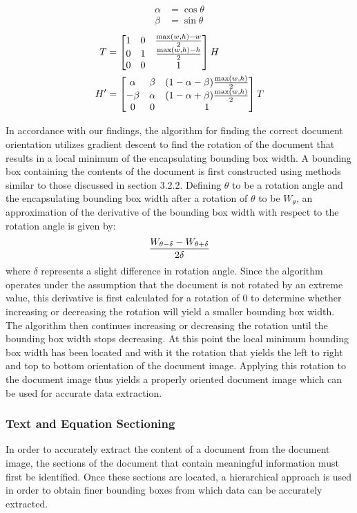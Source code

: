 \documentclass[10pt]{IEEEtran}
\begin{document}
\begin{align*}
\alpha &= \cos \theta \\
\beta &= \sin \theta
\end{align*}
\begin{align*}
T &=
\left[
\begin{matrix}
1 & 0 & {\max(w,h) - w\over{2}} \\
0 & 1 & {\max(w,h) - h\over{2}} \\
0 & 0 & 1
\end{matrix}
\right]
H \\
H' &=
\left[
\begin{matrix}
\alpha & \beta &  (1 - \alpha - \beta){\max(w,h)\over{2}}\\
-\beta & \alpha & (1 - \alpha + \beta){\max(w,h)\over{2}} \\
0 & 0 & 1
\end{matrix}
\right]
T
\end{align*}

In accordance with our findings, the algorithm for finding the correct document orientation utilizes  gradient descent to find the rotation of the document that results in a local minimum of the encapsulating bounding box width.  A bounding box containing the contents of the document is first constructed using methods similar to those discussed in section 3.2.2. Defining $\theta$ to be a rotation angle and the encapsulating bounding box width after a rotation of $\theta$ to be $W_{\theta}$, an approximation of the derivative of the bounding box width with respect to the rotation angle is given by:
\begin{align*}
{W_{\theta - \delta} - W_{\theta + \delta}\over{2\delta}}
\end{align*}
where $\delta$ represents a slight difference in rotation angle. Since the algorithm operates under the assumption that the document is not rotated by an extreme value, this derivative is first calculated for a rotation of 0 to determine whether increasing or decreasing the rotation will yield a smaller bounding box width. The algorithm then continues increasing or decreasing the rotation until the bounding box width stops decreasing. At this point the local minimum bounding box width has been located and with it the rotation that yields the left to right and top to bottom orientation of the document image. Applying this rotation to the document image thus yields a properly oriented document image which can be used for accurate data extraction.

\subsubsection{Text and Equation Sectioning}
In order to accurately extract the content of a document from the document image, the sections of the document that contain meaningful information must first be identified. Once these sections are located, a hierarchical approach is used in order to obtain finer bounding boxes from which data can be accurately extracted.
\end{document}
